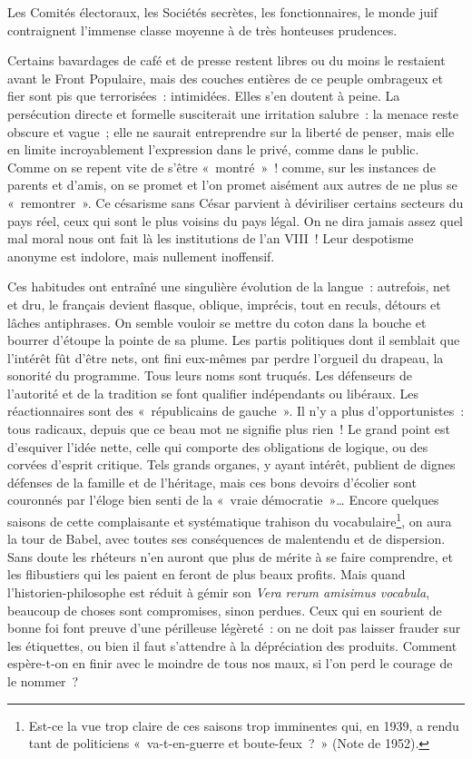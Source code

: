 \documentclass[french,twoside]{book} %
\begin{document}
Les Comités électoraux, les Sociétés secrètes, les fonctionnaires, le monde juif contraignent l’immense classe moyenne à de très honteuses prudences.\par
Certains bavardages de café et de presse restent libres ou du moins le restaient avant le Front Populaire, mais des couches entières de ce peuple ombrageux et fier sont pis que terrorisées : intimidées. Elles s’en doutent à peine. La persécution directe et formelle susciterait une irritation salubre : la menace reste obscure et vague ; elle ne saurait entreprendre sur la liberté de penser, mais elle en limite incroyablement l’expression dans le privé, comme dans le public. Comme on se repent vite de s’être « montré » ! comme, sur les instances de parents et d’amis, on se promet et l’on promet aisément aux autres de ne plus se « remontrer ». Ce césarisme sans César parvient à déviriliser certains secteurs du pays réel, ceux qui sont le plus voisins du pays légal. On ne dira jamais assez quel mal moral nous ont fait là les institutions de l’an VIII ! Leur despotisme anonyme est indolore, mais nullement inoffensif.\par
Ces habitudes ont entraîné une singulière évolution de la langue : autrefois, net et dru, le français devient flasque, oblique, imprécis, tout en reculs, détours et lâches antiphrases. On semble vouloir se mettre du coton dans la bouche et bourrer d’étoupe la pointe de sa plume. Les partis politiques dont il semblait que l’intérêt fût d’être nets, ont fini eux-mêmes par perdre l’orgueil du drapeau, la sonorité du programme. Tous leurs noms sont truqués. Les défenseurs de l’autorité et de la tradition se font qualifier indépendants ou libéraux. Les réactionnaires sont des « républicains de gauche ». Il n’y a plus d’opportunistes : tous radicaux, depuis que ce beau mot ne signifie plus rien ! Le grand point est d’esquiver l’idée nette, celle qui comporte des obligations de logique, ou des corvées d’esprit critique. Tels grands organes, y ayant intérêt, publient de dignes défenses de la famille et de l’héritage, mais ces bons devoirs d’écolier sont couronnés par l’éloge bien senti de la « vraie démocratie »… Encore quelques saisons de cette complaisante et systématique trahison du vocabulaire\footnote{Est-ce la vue trop claire de ces saisons trop imminentes qui, en 1939, a rendu tant de politiciens « va-t-en-guerre et boute-feux ? » (Note de 1952).}, on aura la tour de Babel, avec toutes ses conséquences de malentendu et de dispersion. Sans doute les rhéteurs n’en auront que plus de mérite à se faire comprendre, et les flibustiers qui les paient en feront de plus beaux profits. Mais quand l’historien-philosophe est réduit à gémir son \emph{Vera rerum amisimus vocabula}, beaucoup de choses sont compromises, sinon perdues. Ceux qui en sourient de bonne foi font preuve d’une périlleuse légèreté : on ne doit pas laisser frauder sur les étiquettes, ou bien il faut s’attendre à la dépréciation des produits. Comment espère-t-on en finir avec le moindre de tous nos maux, si l’on perd le courage de le nommer ?\par
\end{document}
